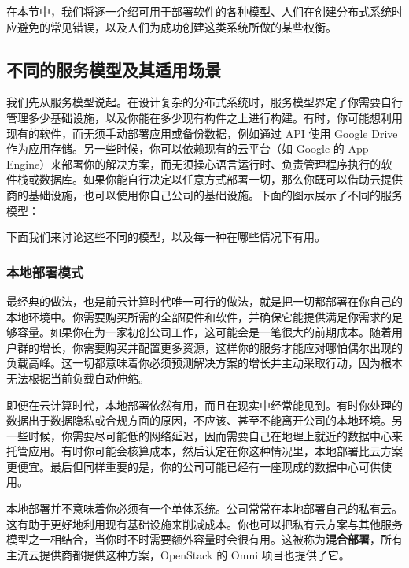 在本节中，我们将逐一介绍可用于部署软件的各种模型、人们在创建分布式系统时应避免的常见错误，以及人们为成功创建这类系统所做的某些权衡。

\subsection{不同的服务模型及其适用场景}

\label{idx:262}
\label{idx:263}
我们先从服务模型说起。在设计复杂的分布式系统时，服务模型界定了你需要自行管理多少基础设施，以及你能在多少现有构件之上进行构建。有时，你可能想利用现有的软件，而无须手动部署应用或备份数据，例如通过 API 使用 Google Drive 作为应用存储。另一些时候，你可以依赖现有的云平台（如 Google 的 App Engine）来部署你的解决方案，而无须操心语言运行时、负责管理程序执行的软件栈或数据库。如果你能自行决定以任意方式部署一切，那么你既可以借助云提供商的基础设施，也可以使用你自己公司的基础设施。下面的图示展示了不同的服务模型：


下面我们来讨论这些不同的模型，以及每一种在哪些情况下有用。

\subsubsection{本地部署模式}

\label{idx:264}
\label{idx:265}
最经典的做法，也是前云计算时代唯一可行的做法，就是把一切都部署在你自己的本地环境中。你需要购买所需的全部硬件和软件，并确保它能提供满足你需求的足够容量。如果你在为一家初创公司工作，这可能会是一笔很大的前期成本。随着用户群的增长，你需要购买并配置更多资源，这样你的服务才能应对哪怕偶尔出现的负载高峰。这一切都意味着你必须预测解决方案的增长并主动采取行动，因为根本无法根据当前负载自动伸缩。

即便在云计算时代，本地部署依然有用，而且在现实中经常能见到。有时你处理的数据出于数据隐私或合规方面的原因，不应该、甚至不能离开公司的本地环境。另一些时候，你需要尽可能低的网络延迟，因而需要自己在地理上就近的数据中心来托管应用。有时你可能会核算成本，然后认定在你这种情况里，本地部署比云方案更便宜。最后但同样重要的是，你的公司可能已经有一座现成的数据中心可供使用。

\label{idx:266}
本地部署并不意味着你必须有一个单体系统。公司常常在本地部署自己的私有云。这有助于更好地利用现有基础设施来削减成本。你也可以把私有云方案与其他服务模型之一相结合，当你时不时需要额外容量时会很有用。这被称为\textbf{混合部署}，所有主流云提供商都提供这种方案，OpenStack 的 Omni 项目也提供了它。

